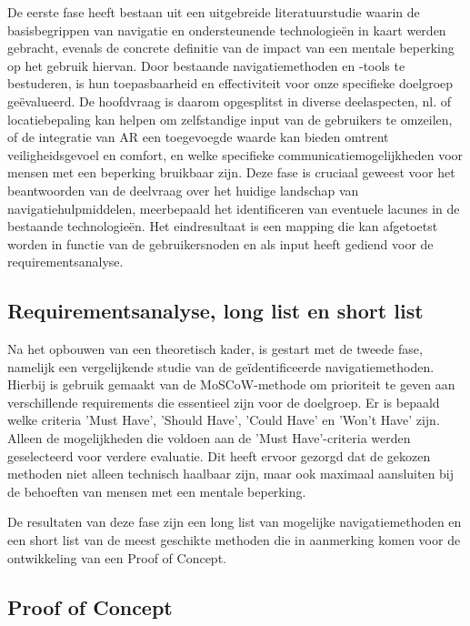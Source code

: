 De eerste fase heeft bestaan uit een uitgebreide literatuurstudie waarin de basisbegrippen van navigatie en ondersteunende technologieën in kaart werden gebracht, evenals de concrete definitie van de impact van een mentale beperking op het gebruik hiervan. Door bestaande navigatiemethoden en -tools te bestuderen, is hun toepasbaarheid en effectiviteit voor onze specifieke doelgroep geëvalueerd. De hoofdvraag is daarom opgesplitst in diverse deelaspecten, nl. of locatiebepaling kan helpen om zelfstandige input van de gebruikers te omzeilen, of de integratie van AR een toegevoegde waarde kan bieden omtrent veiligheidsgevoel en comfort, en welke specifieke communicatiemogelijkheden voor mensen met een beperking bruikbaar zijn. Deze fase is cruciaal geweest voor het beantwoorden van de deelvraag over het huidige landschap van navigatiehulpmiddelen, meerbepaald het identificeren van eventuele lacunes in de bestaande technologieën. Het eindresultaat is een mapping die kan afgetoetst worden in functie van de gebruikersnoden en als input heeft gediend voor de requirementsanalyse.

\subsection*{Requirementsanalyse, long list en short list}

Na het opbouwen van een theoretisch kader, is gestart met de tweede fase, namelijk een vergelijkende studie van de geïdentificeerde navigatiemethoden. Hierbij is gebruik gemaakt van de MoSCoW-methode om prioriteit te geven aan verschillende requirements die essentieel zijn voor de doelgroep. Er is bepaald welke criteria 'Must Have', 'Should Have', 'Could Have' en 'Won't Have' zijn. Alleen de mogelijkheden die voldoen aan de 'Must Have'-criteria werden geselecteerd voor verdere evaluatie. Dit heeft ervoor gezorgd dat de gekozen methoden niet alleen technisch haalbaar zijn, maar ook maximaal aansluiten bij de behoeften van mensen met een mentale beperking.

De resultaten van deze fase zijn een long list van mogelijke navigatiemethoden en een short list van de meest geschikte methoden die in aanmerking komen voor de ontwikkeling van een Proof of Concept.

\subsection*{Proof of Concept}


